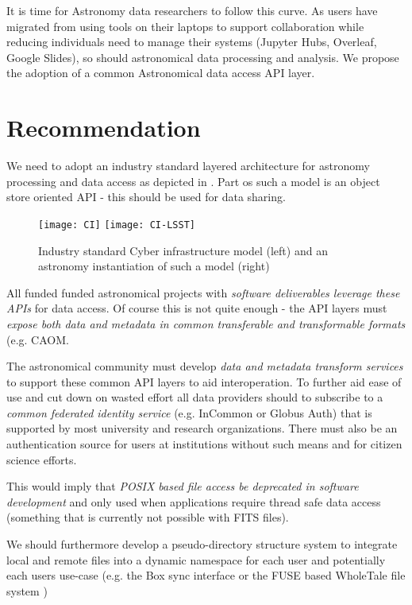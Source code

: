 It is time for Astronomy data researchers to follow this curve. As users have migrated
from using tools on their laptops to support collaboration while reducing
individuals need to manage their systems (Jupyter Hubs, Overleaf, Google Slides),
so should astronomical data processing and analysis. We propose the adoption of
a common Astronomical data access \gls{API} layer.


\section{Recommendation }
We need to adopt an industry  standard layered architecture for astronomy processing and data access as
depicted in . Part os such a model is an object store oriented API - this should be used for data sharing.


\begin{figure}
\centering
\texttt{[image: CI]}
\texttt{[image: CI-LSST]}
\caption{Industry standard Cyber infrastructure model (left) and an astronomy instantiation of such a model (right)\label{fig:ci}}
\end{figure}

All funded funded astronomical projects with \emph{software deliverables leverage these APIs} for data access.
Of course this is not quite enough - the  \gls{API} layers must \emph{expose both data and \gls{metadata} in common
transferable and transformable formats} (e.g. \gls{CAOM}.

The astronomical community must develop \emph{data and \gls{metadata} transform services}
to support these common \gls{API} layers to aid interoperation. To further aid ease of use and cut down on wasted effort
all data providers should  to subscribe to a
\emph{common federated identity service} (e.g. InCommon or
Globus Auth) that is supported by most university and research organizations. There
must also be
an authentication source for users at institutions without such means and for
citizen science efforts.

This would imply that \emph{POSIX based file access be deprecated
in software development} and only used when applications require thread safe
data access (something that is currently not possible with \gls{FITS} files).

We should furthermore  develop a pseudo-directory structure system to
integrate local and remote files into a dynamic namespace for each user and potentially
each users use-case (e.g. the Box sync interface or the \gls{FUSE} based WholeTale file system
\citep{BRINCKMAN2019854})

